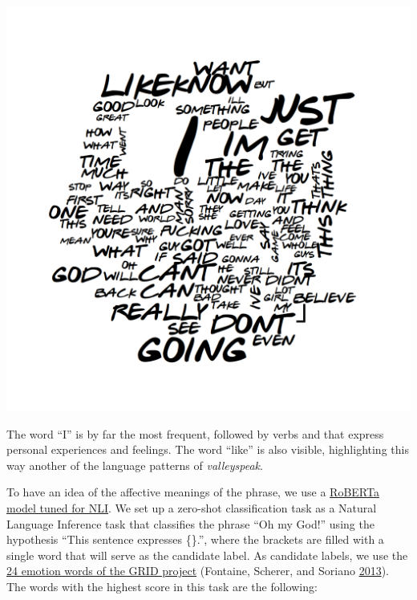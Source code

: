 \documentclass[]{article}
\begin{document}
\begin{center}\includegraphics{Friends_HPS_files/figure-html/unnamed-chunk-14-1.png} \end{center}



The word ``I'' is by far the most frequent, followed by verbs and that express personal experiences and feelings. The word ``like'' is also visible, highlighting this way another of the language patterns of \emph{valleyspeak}.

\newpage

To have an idea of the affective meanings of the phrase, we use a \href{https://huggingface.co/textattack/roberta-base-MNLI}{RoBERTa model tuned for NLI}. We set up a zero-shot classification task as a Natural Language Inference task that classifies the phrase ``Oh my God!'' using the hypothesis ``This sentence expresses \{\}.'', where the brackets are filled with a single word that will serve as the candidate label. As candidate labels, we use the \href{https://www.unige.ch/cisa/research/topics/specific-research-projects/language-and-culture/grid-project/emotion-words/}{24 emotion words of the GRID project} (Fontaine, Scherer, and Soriano \protect\hyperlink{ref-fontaine2013components}{2013}). The words with the highest score in this task are the following:
\end{document}

